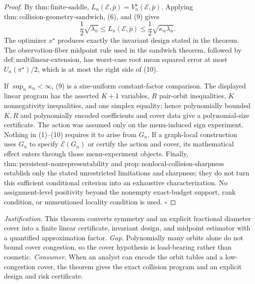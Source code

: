 \documentclass{article}
\begin{document}
\begin{proof}
By \(\mathrm{thm{:}finite\text{-}saddle}\), \(L_n(\mathcal E,\bar p)=V_n^\star(\mathcal E,\bar p)\). Applying \(\mathrm{thm{:}collision\text{-}geometry\text{-}sandwich}\), (6), and (9) gives
\[
 \frac12\sqrt{\lambda_n}
 \le L_n(\mathcal E,\bar p)
 \le\frac12\sqrt{\kappa_n\lambda_n}. \tag{10}
\]
The optimizer \(x^\star\) produces exactly the invariant design stated in the theorem. The observation-fiber midpoint rule used in the sandwich theorem, followed by \(\mathrm{def{:}multilinear\text{-}extension}\), has worst-case root mean squared error at most \(U_n(\pi^\star)/2\), which is at most the right side of (10).

If \(\sup_n\kappa_n<\infty\), (9) is a size-uniform constant-factor comparison. The displayed linear program has the asserted \(K+1\) variables, \(R\) pair-orbit inequalities, \(K\) nonnegativity inequalities, and one simplex equality; hence polynomially bounded \(K,R\) and polynomially encoded coefficients and cover data give a polynomial-size certificate. The action was assumed only on the menu-induced sign experiment. Nothing in (1)--(10) requires it to arise from \(G_n\). If a graph-local construction uses \(G_n\) to specify \(\mathcal E(G_n)\) or certify the action and cover, its mathematical effect enters through those menu-experiment objects. Finally, \(\mathrm{thm{:}persistent\text{-}nonrepresentability}\) and \(\mathrm{prop{:}nonlocal\text{-}collision\text{-}sharpness}\) establish only the stated unrestricted limitations and sharpness; they do not turn this sufficient conditional criterion into an exhaustive characterization. No assignment-level positivity beyond the nonempty exact-budget support, rank condition, or unmentioned locality condition is used. \(\square\)
\end{proof}
\par\smallskip\noindent \textit{Justification.} This theorem converts symmetry and an explicit fractional diameter cover into a finite linear certificate, invariant design, and midpoint estimator with a quantified approximation factor. \textit{Gap.} Polynomially many orbits alone do not bound cover congestion, so the cover hypothesis is load-bearing rather than cosmetic. \textit{Consumer.} When an analyst can encode the orbit tables and a low-congestion cover, the theorem gives the exact collision program and an explicit design and risk certificate.
\end{document}
